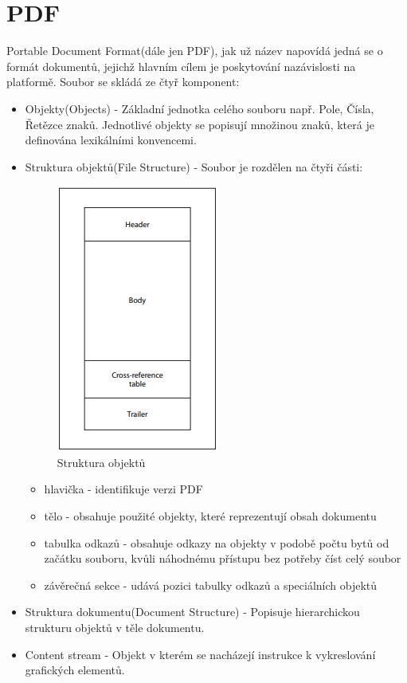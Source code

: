 \section{PDF}
	Portable Document Format(dále jen PDF), jak už název napovídá jedná se o formát dokumentů, jejichž hlavním cílem je poskytování nazávislosti na platformě. Soubor se skládá ze čtyř komponent: 
	\begin{itemize}
		\item Objekty(Objects) - Základní jednotka celého souboru např. Pole, Čísla, Řetězce znaků. Jednotlivé objekty se popisují množinou znaků, která je definována lexikálními konvencemi.
		\item Struktura objektů(File Structure) - Soubor je rozdělen na čtyři části: 
			\begin{figure}
				\includegraphics[scale=0.8]{Untitled}
				\centering
				\caption{Struktura objektů}
			\end{figure}
			\begin{itemize}
				\item hlavička - identifikuje verzi PDF
				\item tělo - obsahuje použité objekty, které reprezentují obsah dokumentu
				\item tabulka odkazů - obsahuje odkazy na objekty v podobě počtu bytů od začátku souboru, kvůli náhodnému přístupu bez potřeby číst celý soubor
				\item závěrečná sekce - udává pozici tabulky odkazů a speciálních objektů
			\end{itemize}
		\item Struktura dokumentu(Document Structure) - Popisuje hierarchickou strukturu objektů v těle dokumentu.
		\item Content stream - Objekt v kterém se nacházejí instrukce k vykreslování grafických elementů. 
	\end{itemize}
	

